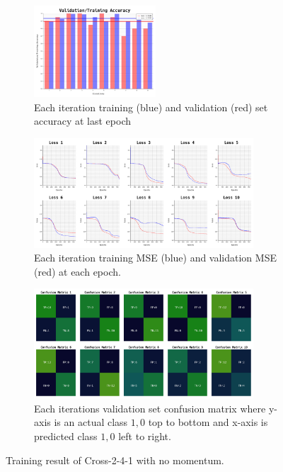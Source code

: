 \documentclass{article}
\begin{document}
\begin{figure}[ht]
	\begin{subfigure}{\textwidth}
		\centering
		\includegraphics[width=0.5\textwidth]{cross-2-4-1_2/acc}
		\caption{Each iteration training (blue) and validation (red) set accuracy at last epoch}
		\label{fig:8a}
	\end{subfigure}
	\begin{subfigure}{\textwidth}
		\centering
		\includegraphics[width=0.9\textwidth]{cross-2-4-1_2/loss}
		\caption{Each iteration training MSE (blue) and validation MSE (red) at each epoch.}
		\label{fig:8b}
	\end{subfigure}
	\begin{subfigure}{\textwidth}
		\centering
		\includegraphics[width=0.9\textwidth]{cross-2-4-1_2/confusion_matrix}
		\caption{Each iterations validation set confusion matrix where y-axis is an actual class $1, 0$ top to bottom and x-axis is predicted class $1, 0$ left to right.}
		\label{fig:8c}
	\end{subfigure}
	\caption{Training result of Cross-2-4-1 with no momentum.}
	\label{fig:8}
\end{figure}
\FloatBarrier
\end{document}
